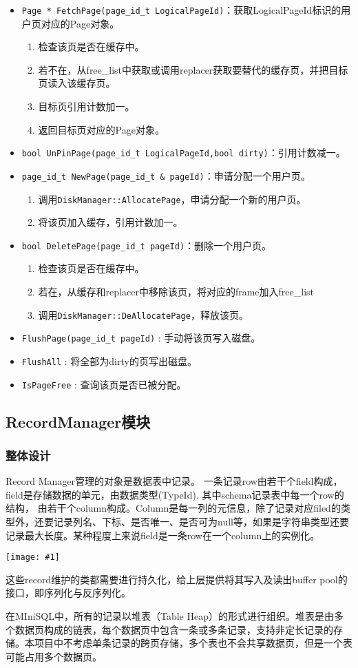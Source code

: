 \documentclass[12pt, a4paper]{article}
\def\c#1{\texttt{#1}}
\def\ss#1{\subsection{#1}}
\def\sss#1{\subsubsection{#1}}
\def\pid{page\_id\_t\ }
\def\p{\par}
\def\g#1{\begin{center}\texttt{[image: \#1]}\end{center}}
\begin{document}
\begin{itemize}
  \item \c{Page * FetchPage(\pid LogicalPageId)}：获取LogicalPageId标识的用户页对应的Page对象。\begin{enumerate}
    \item 检查该页是否在缓存中。
    \item 若不在，从free\_list中获取或调用replacer获取要替代的缓存页，并把目标页读入该缓存页。
    \item 目标页引用计数加一。
    \item 返回目标页对应的Page对象。
  \end{enumerate}
  \item  \c{bool UnPinPage(\pid LogicalPageId,bool dirty)}：引用计数减一。
  \item \c{\pid NewPage(\pid \& pageId)}：申请分配一个用户页。\begin{enumerate}
    \item 调用\c{DiskManager::AllocatePage}，申请分配一个新的用户页。
    \item 将该页加入缓存，引用计数加一。
  \end{enumerate}
  \item \c{bool DeletePage(\pid pageId)}：删除一个用户页。\begin{enumerate}
    \item 检查该页是否在缓存中。
    \item 若在，从缓存和replacer中移除该页，将对应的frame加入free\_list
    \item 调用\c{DiskManager::DeAllocatePage}，释放该页。
  \end{enumerate}
  \item \c{FlushPage(\pid pageId)} : 手动将该页写入磁盘。
  \item \c{FlushAll} : 将全部为dirty的页写出磁盘。
  \item \c{IsPageFree} : 查询该页是否已被分配。 
\end{itemize}
\ss{RecordManager模块}
\sss{整体设计}
\p Record Manager管理的对象是数据表中记录。 一条记录row由若干个field构成，field是存储数据的单元，由数据类型(TypeId). 其中schema记录表中每一个row的结构， 由若干个column构成。Column是每一列的元信息，除了记录对应filed的类型外，还要记录列名、下标、是否唯一、是否可为null等，如果是字符串类型还要记录最大长度。某种程度上来说field是一条row在一个column上的实例化。
\g {imgs/record_1.png}
\p 这些record维护的类都需要进行持久化，给上层提供将其写入及读出buffer pool的接口，即序列化与反序列化。
\p 在MIniSQL中，所有的记录以堆表（Table Heap）的形式进行组织。堆表是由多个数据页构成的链表，每个数据页中包含一条或多条记录，支持非定长记录的存储。本项目中不考虑单条记录的跨页存储，多个表也不会共享数据页，但是一个表可能占用多个数据页。
\end{document}
